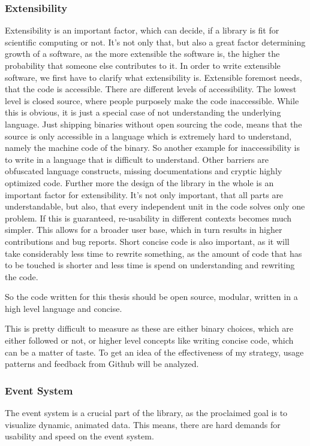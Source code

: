 \subsubsection{Extensibility}
Extensibility is an important factor, which can decide, if a library is fit for scientific computing or not. 
It's not only that, but also a great factor determining growth of a software, as the more extensible the software is, the higher the probability that someone else contributes to it.
In order to write extensible software, we first have to clarify what extensibility is.
Extensible foremost needs, that the code is accessible. There are different levels of accessibility. The lowest level is closed source, where people purposely make the code inaccessible. While this is obvious, it is just a special case of not understanding the underlying language. Just shipping binaries without open sourcing the code, means that the source is only accessible in a language which is extremely hard to understand, namely the machine code of the binary. So another example for inaccessibility is to write in a language that is difficult to understand. Other barriers are obfuscated language constructs, missing documentations and cryptic highly optimized code.
Further more the design of the library in the whole is an important factor for extensibility. It's not only important, that all parts are understandable, but also, that every independent unit in the code solves only one problem.
If this is guaranteed, re-usability in different contexts becomes much simpler. This allows for a broader user base, which in turn results in higher contributions and bug reports.
Short concise code is also important, as it will take considerably less time to rewrite something, as the amount of code that has to be touched is shorter and less time is spend on understanding and rewriting the code.

So the code written for this thesis should be open source, modular, written in a high level language and concise.

This is pretty difficult to measure as these are either binary choices, which are either followed or not, 
or higher level concepts like writing concise code, which can be a matter of taste.
To get an idea of the effectiveness of my strategy, usage patterns and feedback from Github will be analyzed.

\subsubsection{Event System}
The event system is a crucial part of the library, as the proclaimed goal is to visualize dynamic, animated data.
This means, there are hard demands for usability and speed on the event system.


